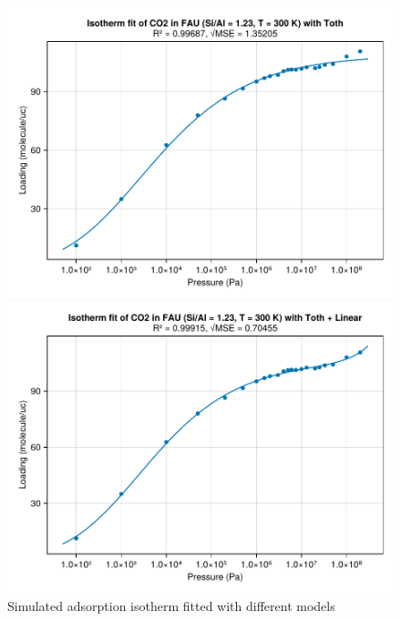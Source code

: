 \documentclass[main.tex]{subfiles}
\begin{document}
\begin{figure}
	\begin{minipage}{0.49\columnwidth}
		\includegraphics[width=\columnwidth]{figures/isotherms/Toth.pdf}
	\end{minipage}\hfill%
	\begin{minipage}{0.49\columnwidth}
		\includegraphics[width=\columnwidth]{figures/isotherms/Toth + Linear.pdf}
	\end{minipage}
	\caption{Simulated adsorption isotherm fitted with different models}\label{isothermfit}
\end{figure}
\end{document}
